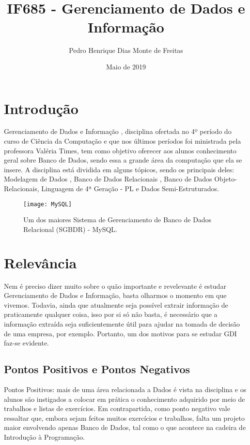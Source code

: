 \documentclass[10pt]{article}
\title{IF685 - Gerenciamento de Dados e Informação}
\author{Pedro Henrique Dias Monte de Freitas}
\date{Maio de 2019}
\begin{document}
\maketitle

\section{Introdução}
Gerenciamento de Dados e Informação \cite{site}, disciplina ofertada no 4º período do curso de Ciência da Computação e que nos últimos períodos foi ministrada pela professora Valéria Times, tem como objetivo oferecer aos alunos conhecimento geral sobre Banco de Dados, sendo essa a grande área da computação que ela se insere. A disciplina está dividida em alguns tópicos, sendo os principais deles: Modelagem de Dados \cite{navathe}, Banco de Dados Relacionais \cite{ramak}, Banco de Dados Objeto-Relacionais, Linguagem de 4ª Geração - PL e Dados Semi-Estruturados.

\begin{figure}[h!]
\centering
\texttt{[image: MySQL]}
\caption{Um dos maiores Sistema de Gerenciamento de Banco de Dados Relacional (SGBDR) - MySQL.}
\label{fig:MySQL}
\end{figure}

\section{Relevância}
Nem é preciso dizer muito sobre o quão importante e revelevante é estudar Gerenciamento de Dados e Informação, basta olharmos o momento em que vivemos. Todavia, ainda que atualmente seja possível extrair informação de praticamente qualquer coisa, isso por si só não basta, é necessário que a informação extraída seja suficientemente útil para ajudar na tomada de decisão de uma empresa, por exemplo. Portanto, um dos motivos para se estudar GDI faz-se evidente.

\subsection{Pontos Positivos e Pontos Negativos}
Pontos Positivos: mais de uma área relacionada a Dados é vista na disciplina e os alunos são instigados a colocar em prática o conhecimento adquirido por meio de trabalhos e listas de exercícios. Em contrapartida, como ponto negativo vale ressaltar que, embora sejam feitos muitos exercícios e trabalhos, falta um projeto maior envolvendo apenas Banco de Dados, tal como o que acontece na cadeira de Introdução à Programação.  
\end{document}
